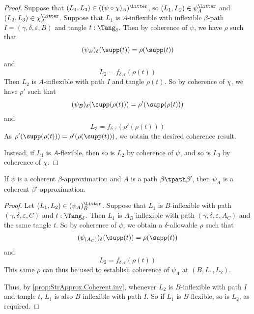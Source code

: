 \begin{proof}
  Suppose that \( (L_1, L_3) \in ((\psi \circ \chi)_A)^\Litter \), so \( (L_1, L_2) \in \psi_A^\Litter \) and \( (L_2, L_3) \in \chi_A^\Litter \).
  Suppose that \( L_1 \) is \( A \)-inflexible with inflexible \( \beta \)-path \( I = (\gamma, \delta, \varepsilon, B) \) and tangle \( t : \Tang_\delta \).
  Then by coherence of \( \psi \), we have \( \rho \) such that
  \[ (\psi_B)_\delta(\supp(t)) = \rho(\supp(t)) \]
  and
  \[ L_2 = f_{\delta,\varepsilon}(\rho(t)) \]
  Then \( L_2 \) is \( A \)-inflexible with path \( I \) and tangle \( \rho(t) \).
  So by coherence of \( \chi \), we have \( \rho' \) such that
  \[ (\psi_B)_\delta(\supp(\rho(t))) = \rho'(\supp(\rho(t))) \]
  and
  \[ L_3 = f_{\delta,\varepsilon}(\rho'(\rho(t))) \]
  As \( \rho'(\supp(\rho(t))) = \rho'(\rho(\supp(t))) \), we obtain the desired coherence result.

  Instead, if \( L_1 \) is \( A \)-flexible, then so is \( L_2 \) by coherence of \( \psi \), and so is \( L_3 \) by coherence of \( \chi \).
\end{proof}
\begin{proposition}
  \label{prop:StrApprox.Coherent.deriv}
  If \( \psi \) is a coherent \( \beta \)-approximation and \( A \) is a path \( \beta \tpath \beta' \), then \( \psi_A \) is a coherent \( \beta' \)-approximation.
\end{proposition}
\begin{proof}
  Let \( (L_1, L_2) \in (\psi_A)_B^\Litter \).
  Suppose that \( L_1 \) is \( B \)-inflexible with path \( (\gamma, \delta, \varepsilon, C) \) and \( t : \Tang_\delta \).
  Then \( L_1 \) is \( A_B \)-inflexible with path \( (\gamma, \delta, \varepsilon, A_C) \) and the same tangle \( t \).
  So by coherence of \( \psi \), we obtain a \( \delta \)-allowable \( \rho \) such that
  \[ (\psi_{(A_C)})_\delta(\supp(t)) = \rho(\supp(t)) \]
  and
  \[ L_2 = f_{\delta,\varepsilon}(\rho(t)) \]
  This same \( \rho \) can thus be used to establish coherence of \( \psi_A \) at \( (B, L_1, L_2) \).

  Thus, by \cref{prop:StrApprox.Coherent.inv}, whenever \( L_2 \) is \( B \)-inflexible with path \( I \) and tangle \( t \), \( L_1 \) is also \( B \)-inflexible with path \( I \).
  So if \( L_1 \) is \( B \)-flexible, so is \( L_2 \), as required.
\end{proof}

